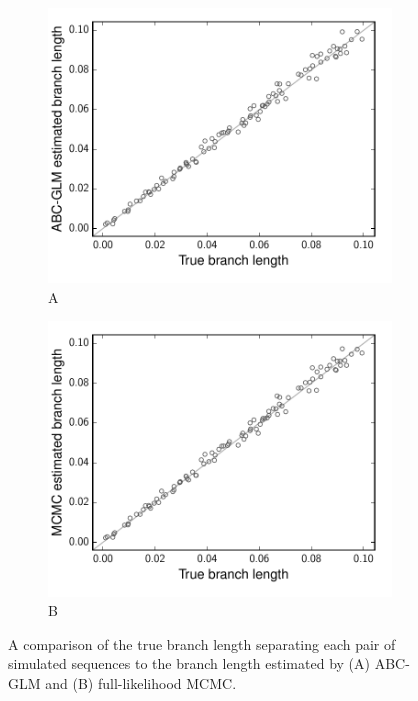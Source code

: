 \begin{figure}[htbp]
    \begin{subfigure}[b]{0.5\textwidth}
        \includegraphics[width=\textwidth]{images/glm-branch-length-plot.pdf}
        \caption{A}
    \end{subfigure}
    \hfill
    \begin{subfigure}[b]{0.5\textwidth}
        \includegraphics[width=\textwidth]{images/mcmc-branch-length-plot.pdf}
        \caption{B}
    \end{subfigure}
    \captionsetup{name=Figure S, labelformat=noSpace, listformat=sFigList}
    \caption{A comparison of the true branch length separating each pair of
        simulated sequences to the branch length estimated by (A) ABC-GLM and
        (B) full-likelihood MCMC.}
    \label{fig:branchLengthEstimates}
\end{figure}
